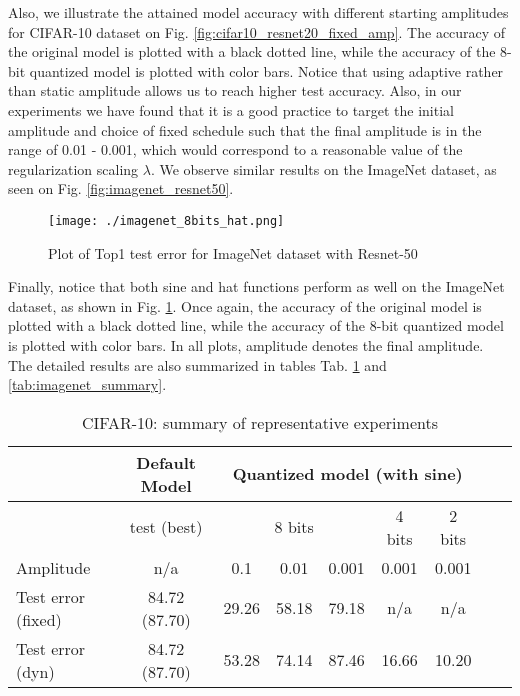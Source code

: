 \documentclass{article}
\newcommand{\squeeze}{\vspace{-2.5mm}}
\begin{document}
Also, we illustrate the attained model accuracy with different starting amplitudes for CIFAR-10 dataset on Fig. \ref{fig:cifar10_resnet20_fixed_amp}. The accuracy of the original model is plotted with a black dotted line, while the accuracy of the 8-bit quantized model is plotted with color bars. Notice that using adaptive rather than static amplitude allows us to reach higher test accuracy. Also, in our experiments we have found that it is a good practice to target the initial amplitude and choice of fixed schedule such that the final amplitude is in the range of 0.01 - 0.001, which would correspond to a reasonable value of the regularization scaling $\lambda$. We observe similar results on the ImageNet dataset, as seen on Fig. \ref{fig:imagenet_resnet50}.

\begin{figure}[h]
 \begin{center}
  \texttt{[image: ./imagenet\_8bits\_hat.png]}
  \caption{Plot of Top1 test error for ImageNet dataset with Resnet-50}
  \label{fig:imagenet_hat_resnet50}
  \squeeze
 \end{center}
\end{figure}

Finally, notice that both sine and hat functions perform as well on the ImageNet dataset, as shown in Fig. \ref{fig:imagenet_hat_resnet50}. Once again, the accuracy of the original model is plotted with a black dotted line, while the accuracy of the 8-bit quantized model is plotted with color bars. In all plots, amplitude denotes the final amplitude. The detailed results are also summarized in tables Tab. \ref{tab:cifar10_summary} and \ref{tab:imagenet_summary}.

\begin{table}[h]
\centering
\begin{tabular}{l|c|c|c|c|c|c|c|c}
   & Default Model & \multicolumn{5}{c|}{Quantized model (with sine)} \\
\hline
           & test (best)   & \multicolumn{3}{c|}{8 bits}   & 4 bits & 2 bits \\
\hline
Amplitude  & n/a           & 0.1   & 0.01  & 0.001         & 0.001 & 0.001 \\
\hline
Test error (fixed) & 84.72 (87.70) & 29.26 & 58.18 & 79.18 & n/a   & n/a   \\
Test error (dyn)   & 84.72 (87.70) & 53.28 & 74.14 & 87.46 & 16.66 & 10.20 \\
\end{tabular}
\caption{CIFAR-10: summary of representative experiments}
\label{tab:cifar10_summary}
\squeeze
\end{table}
\end{document}
